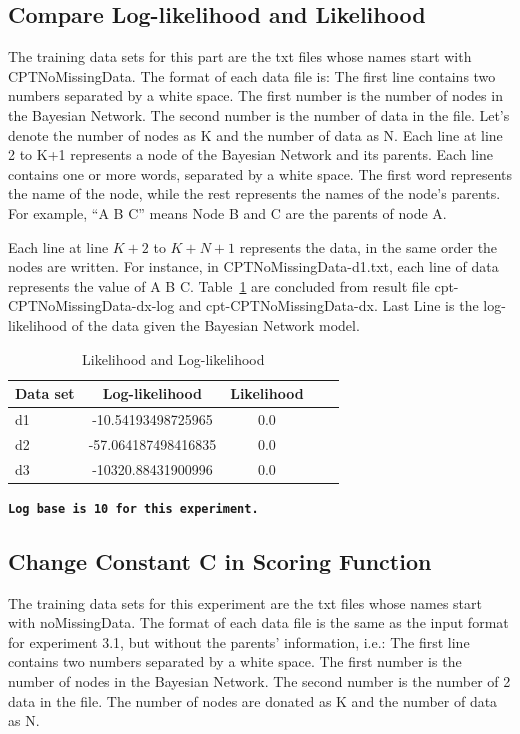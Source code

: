 \documentclass{article}
\begin{document}
\subsection{Compare Log-likelihood and Likelihood}
The training data sets for this part are the txt files whose names start with CPTNoMissingData. The format of each data file is:
The first line contains two numbers separated by a white space. The first number is the number of nodes in the Bayesian Network. 
The second number is the number of data in the file. Let’s denote the number of nodes as K and the number of data as N. Each line at line 2 to K+1 represents a node of the Bayesian Network and its parents. Each line contains one or more words, separated by a white space. The first word represents the name of the node, while the rest represents the names of the node’s parents. For example, “A B C” means Node B and C are the parents of node A. 

Each line at line $K+2$ to $K+N+1$ represents the data, in the same order the nodes are written. For instance, in CPTNoMissingData-d1.txt, each line of data represents the value of A B C.
Table~\ref{likeli-table} are concluded from result file cpt-CPTNoMissingData-dx-log and cpt-CPTNoMissingData-dx. Last Line is the log-likelihood of the data given the Bayesian Network model.

\begin{table}[t]
\caption{Likelihood and Log-likelihood}
\label{likeli-table}
\vskip 0.15in
\begin{center}
\begin{small}
\begin{sc}
\begin{tabular}{lcccr}
\hline
\abovespace\belowspace
Data set & Log-likelihood & Likelihood \\
\hline
\abovespace
d1    & -10.54193498725965 & 0.0& \\
d2	  & -57.064187498416835 & 0.0& \\
d3    & -10320.88431900996 & 0.0&  \\
\hline
\end{tabular}
\end{sc}
\end{small}
\end{center}
\vskip -0.1in
\end{table}
\textbf{\texttt{Log base is 10 for this experiment.}}

\subsection{Change Constant C in Scoring Function}
The training data sets for this experiment are the txt files whose names start with noMissingData. 
The format of each data file is the same as the input format for experiment 3.1, but without the parents’ information, i.e.: The first line contains two numbers separated by a white space. The first number is the number of nodes in the Bayesian Network. The second number is the number of 2 data in the file. The number of nodes are donated as K and the number of data as N. 
\end{document}
